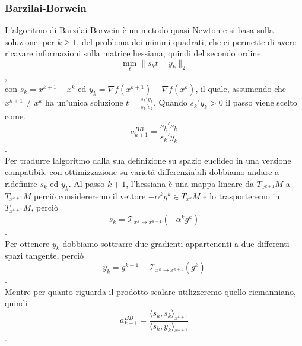 \documentclass[a4paper, 12pt]{article}
\begin{document}
\subsubsection{Barzilai-Borwein}
L'algoritmo di Barzilai-Borwein è un metodo quasi Newton e si basa sulla soluzione, per $k \geq 1$, del problema dei minimi quadrati, che ci permette di avere ricavare informazioni sulla matrice hessiana, quindi del secondo ordine.\\
\[\min_{t} \parallel s_kt - y_k \parallel_2 \],\\
con $s_k = x^{k+1} - x^k$ ed $y_k = \nabla f(x^{k+1}) - \nabla f(x^k)$, il quale, assumendo che $x^{k+1} \neq x^k$ ha un'unica soluzione $t = \frac{s_k'y_k}{s_k's_k}$. Quando $s_k'y_k > 0$ il passo viene scelto come.\\
\[a_{k+1}^{BB} = \frac{s_k's_k}{s_k'y_k}\].\\
Per tradurre lalgoritmo dalla sua definizione su spazio euclideo in una versione compatibile con ottimizzazione su varietà differenziabili dobbiamo andare a ridefinire $s_k$ ed $y_k$. Al passo $k+1$, l'hessiana è una mappa lineare da $T_{x^{k+1}}M$ a $T_{x^{k+1}}M$ perciò considereremo il vettore $-\alpha^kg^k \in T_{x^k}M$ e lo trasporteremo in $T_{x^{k+1}}M$, perciò\\
\[s_k = \mathcal{T}_{x^k \to x^{k+1}}(-\alpha^kg^k)\].\\
Per ottenere $y_k$ dobbiamo sottrarre due gradienti appartenenti a due differenti spazi tangente, perciò
\[y_k = g^{k+1} - \mathcal{T}_{x^k \to x^{k+1}}(g^k)\].\\
Mentre per quanto riguarda il prodotto scalare utilizzeremo quello riemanniano, quindi\\
\[a_{k+1}^{BB} = \frac{\langle s_k,s_k \rangle_{x^{k+1}}}{\langle s_k,y_k \rangle_{x^{k+1}}}\].\\
\end{document}
